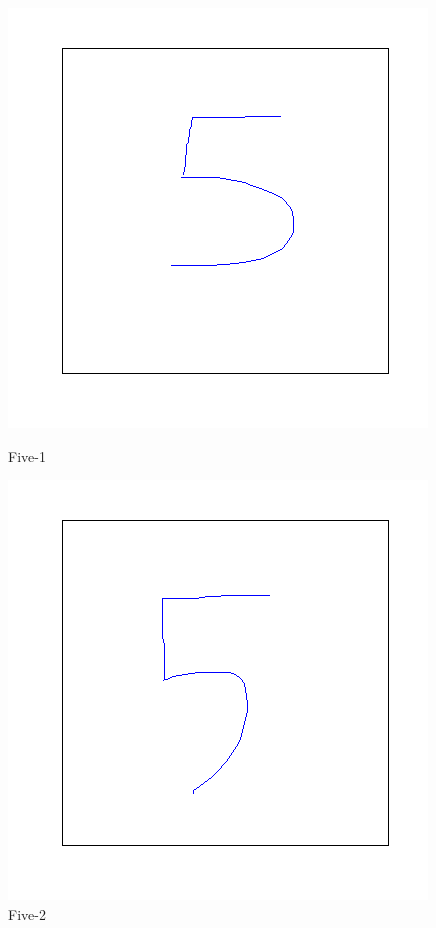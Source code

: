 \documentclass[a4paper, 10pt]{article}
\begin{document}
\begin{figure}[ht]
\begin{minipage}[b]{0.45\linewidth}
\centering
\includegraphics[width=\textwidth]{figs/5-1}
\caption{Five-1}
\label{fig:figure1}
\end{minipage}
\hspace{0.5cm}
\begin{minipage}[b]{0.45\linewidth}
\centering
\includegraphics[width=\textwidth]{figs/5-2}
\caption{Five-2}
\label{fig:figure2}
\end{minipage}
\end{figure}
\end{document}
